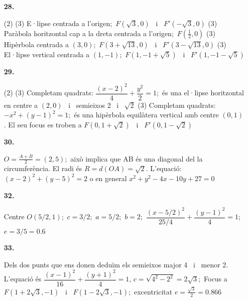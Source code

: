 \documentclass{book}
\newenvironment{pageandsolTwo}[2][]{

\newpage

\heading{Solucions de la pàgina #2:}
\normalfont
	\vspace{0.25cm}
  \begin{multicols}{2}
}{
\end{multicols} 
 \vspace{0.25cm}

}
\begin{document}
\begin{pageandsolTwo}{136}
\begin{enumerate}
\item[\fontfamily{phv}\selectfont\large\color{blue}\textbf{28. }] 

 \begin{tasks}[label-format=\bfseries\large](2)
	 \task*(3) E·lipse centrada a l'origen;\, $F(\sqrt {3},0)$ \, i \, $F'(-\sqrt {3},0)$
	 \task*(3) Paràbola horitzontal cap a la dreta centrada a l'origen;\, $F(\frac {1}{2},0)$
	 \task*(3) Hipèrbola centrada a $(3,0)$;\, $F(3+\sqrt {13},0)$ \, i \, $F'(3-\sqrt {13},0)$
	 \task*(3) El·lipse vertical centrada a $(1,-1)$;\, $F(1,-1+\sqrt {5})$ \, i \, $F'(1,-1-\sqrt {5})$
\end{tasks}

\mbox{}\vspace{0.25cm}
\item[\fontfamily{phv}\selectfont\large\color{blue}\textbf{29. }] 

 \begin{tasks}[label-format=\bfseries\large](2)
	 \task*(3) Completam quadrats: $\dfrac {(x-2)^2}{4}+\dfrac {y^2}{2}=1$;\, és una el·lipse horitzontal en centre a $(2,0)$ \, i \, semieixos 2 \, i \, $\sqrt {2}$
	 \task*(3) Completam quadrats: $-x^2 + (y-1)^2 = 1$;\, és una hipèrbola equilàtera vertical amb centre $(0,1)$. El seu focus es troben a $F(0,1+\sqrt {2})$ \, i \, $F'(0,1-\sqrt {2})$ 
\end{tasks}

\mbox{}\vspace{0.25cm}
\item[\fontfamily{phv}\selectfont\large\color{blue}\textbf{30. }] 

$O=\frac {A+B}{2}=(2,5)$;\, això implica que AB és una diagonal del la circumferència. El radi és $R=d(OA)=\sqrt {2}$. L'equació: $(x-2)^2+(y-5)^2=2$ o en general $x^2+y^2-4x-10y+27=0$
\mbox{}\vspace{0.25cm}

\item[\fontfamily{phv}\selectfont\large\color{blue}\textbf{32. }] 

Centre $O(5/2,1)$;\, $c=3/2$;\, $a=5/2$;\, $b=2$;\, $\dfrac {(x-5/2)^2}{25/4}+\dfrac {(y-1)^2}{4}=1$;\, $e=3/5=0.6$
\mbox{}\vspace{0.25cm}

\item[\fontfamily{phv}\selectfont\large\color{blue}\textbf{33. }] 

Dels dos punts que ens donen deduïm els semieixos major 4 \, i \, menor 2. L'equació és $\dfrac {(x-1)^2}{16}+\dfrac {(y+1)^2}{4}=1$, $c=\sqrt {4^2-2^2}=2\sqrt {3}$;\, Focus a $F(1+2\sqrt {3},-1)$ \, i \, $F(1-2\sqrt {3},-1)$;\, excentricitat $e=\frac {\sqrt {3}}{2}=0.866$
\mbox{}\vspace{0.25cm}

 \end{enumerate}

  \end{pageandsolTwo}
\end{document}
